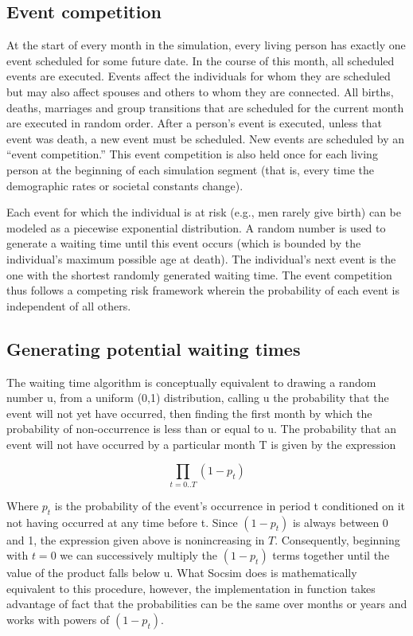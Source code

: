 
\subsection{Event competition}
\label{sec:eventcomp}
At the start of every month in the simulation, every living person has
exactly one event scheduled for some future date. In the course of
this month, all scheduled events are executed.  Events affect the
individuals for whom they are scheduled but may also affect spouses
and others to whom they are connected. All births, deaths, marriages and
group transitions that are scheduled for the current month are
executed in random order.  After a person's event is executed, unless
that event was death, a new event must be scheduled. 
New events are scheduled 
by an ``event competition.'' This event competition is also held once
for each living person at the beginning of each simulation segment
(that is, every time the demographic rates or societal constants
change).

Each event for which the individual is at risk (e.g., men rarely give
birth) can be modeled as a piecewise exponential distribution. A
random number is used to generate a waiting time until this event
occurs (which is bounded by the individual's maximum possible age at
death). The individual's next event is the one with the shortest
randomly generated waiting time. The event competition thus follows a
competing risk framework wherein the probability of each event is
independent of all others.


\subsection{Generating potential waiting times}
\label{sec:datev}

The waiting time algorithm is conceptually equivalent to drawing a
random number u, from a uniform (0,1) distribution, calling u the
probability that the event will not yet have occurred, then finding
the first month by which the probability of non-occurrence is less
than or equal to u. The probability that an event will not have
occurred by a particular month T is given by the expression

\begin{equation}
  \label{eq:probnon}
  \prod_{t=0..T} (1-p_{t})
\end{equation}



Where $p_{t}$ is the probability of the event's occurrence in period t
conditioned on it not having occurred at any time before t. Since
$(1-p_{t})$ is always between 0 and 1, the expression given above is
nonincreasing in $T$. Consequently, beginning with $t = 0$ we can
successively multiply the $(1-p_{t})$ terms together until the value of
the product falls below u. What Socsim does is mathematically
equivalent to this procedure, however, the implementation in function
 takes advantage of fact that the probabilities can be the
same over months or years and works with powers of $(1-p_{t})$.
